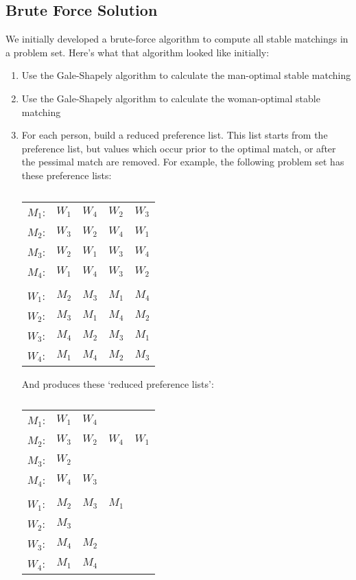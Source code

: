 \documentclass[a4paper]{article}
\begin{document}
\subsection{Brute Force Solution}
We initially developed a brute-force algorithm to compute all stable matchings in a problem set. Here's what that algorithm looked like initially:
\begin{enumerate}
    \item Use the Gale-Shapely algorithm to calculate the man-optimal stable matching
    
    \item Use the Gale-Shapely algorithm to calculate the woman-optimal stable matching
    
    \item For each person, build a reduced preference list. This list starts from the preference list, but values which occur prior to the optimal match, or after the pessimal match are removed. For example, the following problem set has these preference lists:


\begin{table}[H]
\caption{}
\begin{tabular}{lllll}
$M_1$: & $W_1$ & $W_4$ & $W_2$ & $W_3$ \\
$M_2$: & $W_3$ & $W_2$ & $W_4$ & $W_1$ \\
$M_3$: & $W_2$ & $W_1$ & $W_3$ & $W_4$ \\
$M_4$: & $W_1$ & $W_4$ & $W_3$ & $W_2$ \\
\\
$W_1$: & $M_2$ & $M_3$ & $M_1$ & $M_4$ \\
$W_2$: & $M_3$ & $M_1$ & $M_4$ & $M_2$ \\
$W_3$: & $M_4$ & $M_2$ & $M_3$ & $M_1$ \\
$W_4$: & $M_1$ & $M_4$ & $M_2$ & $M_3$ \\
\end{tabular}
\end{table}

And produces these `reduced preference lists':
\begin{table}[H]
\caption{}
\begin{tabular}{lllll}
$M_1$: & $W_1$ & $W_4$ & &       \\
$M_2$: & $W_3$ & $W_2$ & $W_4$ & $W_1$ \\
$M_3$: & $W_2$ & & &          \\
$M_4$: & $W_4$ & $W_3$ & &       \\
                        \\
$W_1$: & $M_2$ & $M_3$ & $M_1$ &    \\
$W_2$: & $M_3$ & & &          \\
$W_3$: & $M_4$ & $M_2$ & &       \\
$W_4$: & $M_1$ & $M_4$ & &       \\
\end{tabular}
\end{table}


\end{enumerate}
\end{document}
